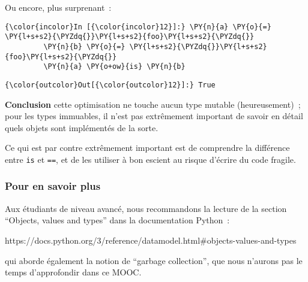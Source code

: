     Ou encore, plus surprenant~:

    \begin{Verbatim}[commandchars=\\\{\},frame=single,framerule=0.3mm,rulecolor=\color{cellframecolor}]
{\color{incolor}In [{\color{incolor}12}]:} \PY{n}{a} \PY{o}{=} \PY{l+s+s2}{\PYZdq{}}\PY{l+s+s2}{foo}\PY{l+s+s2}{\PYZdq{}}
         \PY{n}{b} \PY{o}{=} \PY{l+s+s2}{\PYZdq{}}\PY{l+s+s2}{foo}\PY{l+s+s2}{\PYZdq{}}
         \PY{n}{a} \PY{o+ow}{is} \PY{n}{b}
\end{Verbatim}


\begin{Verbatim}[commandchars=\\\{\},frame=single,framerule=0.3mm,rulecolor=\color{cellframecolor}]
{\color{outcolor}Out[{\color{outcolor}12}]:} True
\end{Verbatim}
            
    \textbf{Conclusion} cette optimisation ne touche aucun type mutable
(heureusement)~; pour les types immuables, il n'est pas extrêmement
important de savoir en détail quels objets sont implémentés de la sorte.

Ce qui est par contre extrêmement important est de comprendre la
différence entre \texttt{is} et \texttt{==}, et de les utiliser à bon
escient au risque d'écrire du code fragile.

    \hypertarget{pour-en-savoir-plus}{%
\subsubsection{Pour en savoir plus}\label{pour-en-savoir-plus}}

    Aux étudiants de niveau avancé, nous recommandons la lecture de la
section ``Objects, values and types'' dans la documentation Python~:

https://docs.python.org/3/reference/datamodel.html\#objects-values-and-types

qui aborde également la notion de ``garbage collection'', que nous
n'aurons pas le temps d'approfondir dans ce MOOC.


    
    
    
